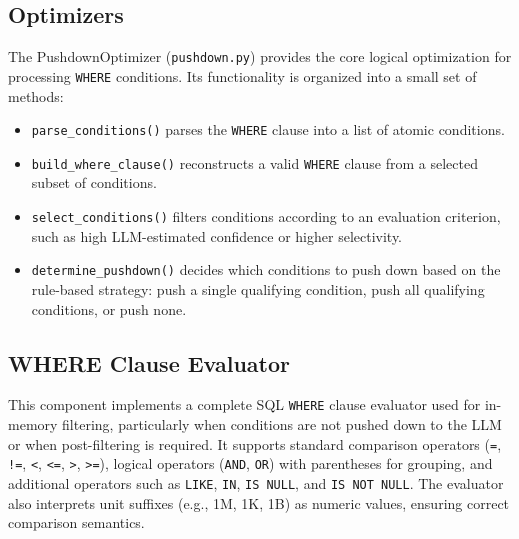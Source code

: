 \documentclass[12pt]{article}
\begin{document}
\subsection{Optimizers}
The PushdownOptimizer (\texttt{pushdown.py}) provides the core logical optimization for processing \texttt{WHERE} conditions. Its functionality is organized into a small set of methods:
\begin{itemize}
    \item \texttt{parse\_conditions()} parses the \texttt{WHERE} clause into a list of atomic conditions.
    \item \texttt{build\_where\_clause()} reconstructs a valid \texttt{WHERE} clause from a selected subset of conditions.
    \item \texttt{select\_conditions()} filters conditions according to an evaluation criterion, such as high LLM-estimated confidence or higher selectivity.
    \item \texttt{determine\_pushdown()} decides which conditions to push down based on the rule-based strategy: push a single qualifying condition, push all qualifying conditions, or push none.
\end{itemize}

\subsection{WHERE Clause Evaluator}
This component implements a complete SQL \texttt{WHERE} clause evaluator used for in-memory filtering, particularly when conditions are not pushed down to the LLM or when post-filtering is required. It supports standard comparison operators (\texttt{=}, \texttt{!=}, \texttt{<}, \texttt{<=}, \texttt{>}, \texttt{>=}), logical operators (\texttt{AND}, \texttt{OR}) with parentheses for grouping, and additional operators such as \texttt{LIKE}, \texttt{IN}, \texttt{IS NULL}, and \texttt{IS NOT NULL}. The evaluator also interprets unit suffixes (e.g., 1M, 1K, 1B) as numeric values, ensuring correct comparison semantics.
\end{document}
